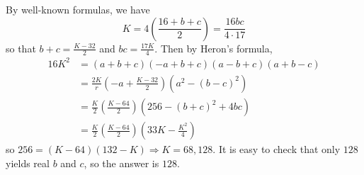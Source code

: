 \documentclass[10pt]{article}
\begin{document}
\begin{enumerate}
\par By well-known formulas, we have 
$$K=4\left(\frac{16+b+c}{2}\right)=\frac{16bc}{4\cdot 17}$$ so that $b+c=\frac{K-32}{2}$ and $bc=\frac{17K}{4}$. Then by Heron's formula,
\begin{align*}16K^2&=(a+b+c)(-a+b+c)(a-b+c)(a+b-c)
\\&=\frac{2K}{r}\left(-a+\frac{K-32}{2}\right)(a^2-(b-c)^2)
\\&=\frac{K}{2}\left(\frac{K-64}{2}\right)(256-(b+c)^2+4bc)
\\&=\frac{K}{2}\left(\frac{K-64}{2}\right)\left(33K-\frac{K^2}{4}\right)\end{align*}
so $256=(K-64)(132-K)\Longrightarrow K=68,128$. It is easy to check that only $128$ yields real $b$ and $c$, so the answer is $\boxed{128}$.

\end{enumerate}
\end{document}
